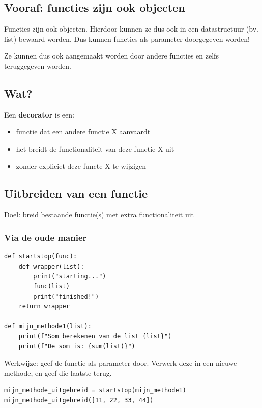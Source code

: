 \documentclass{article}
\begin{document}
\subsection{Vooraf: functies zijn ook objecten}

Functies zijn ook objecten. Hierdoor kunnen ze dus ook in een datastructuur (bv. list) bewaard worden.
Dus kunnen functies als parameter doorgegeven worden!

Ze kunnen dus ook aangemaakt worden door andere functies en zelfs teruggegeven worden.

\subsection{Wat?}

Een \textbf{decorator} is een:

\begin{itemize}
    \item functie dat een andere functie X aanvaardt
    \item het breidt de functionaliteit van deze functie X uit
    \item zonder expliciet deze functe X te wijzigen
\end{itemize}

\subsection{Uitbreiden van een functie}

Doel: breid bestaande functie(s) met extra functionaliteit uit

\subsubsection{Via de oude manier}

\begin{verbatim}
def startstop(func):
    def wrapper(list):
        print("starting...")
        func(list)
        print("finished!")
    return wrapper

def mijn_methode1(list):
    print(f"Som berekenen van de list {list}")
    print(f"De som is: {sum(list)}")
\end{verbatim}

Werkwijze: geef de functie als parameter door. Verwerk deze in een nieuwe methode, en geef die laatste terug.

\begin{verbatim}
mijn_methode_uitgebreid = startstop(mijn_methode1)
mijn_methode_uitgebreid([11, 22, 33, 44])
\end{verbatim}
\end{document}
